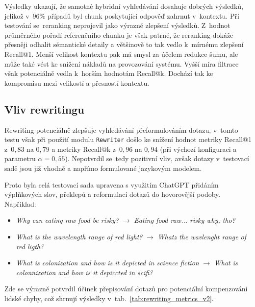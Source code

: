 Výsledky ukazují, že samotné hybridní vyhledávání dosahuje dobrých výsledků, jelikož v~96\% případů byl chunk poskytující odpověď zahrnut v~kontextu. Při testování se~reranking neprojevil jako výrazné zlepšení výsledků. Z~hodnot průměrného pořadí referenčního chunku je však patrné, že reranking dokáže přesněji odhalit sémantické detaily a většinově to tak vedlo k~mírnému zlepšení Recall@1. Menší velikost kontextu pak má smysl za účelem redukce šumu, ale může také vést ke snížení nákladů na provozování systému. Vyšší míra filtrace však potenciálně vedla k~horším hodnotám Recall@k. Dochází tak ke kompromisu mezi velikostí a přesností kontextu.   

\subsection{Vliv rewritingu}
Rewriting potenciálně zlepšuje vyhledávání přeformulováním dotazu, v~tomto testu však při použití modulu \texttt{Rewriter} došlo ke snížení hodnot metriky Recall@1 z~$0{,}83$ na $0{,}79$ a metriky Recall@k z~$0{,}96$ na $0{,}94$ (při výchozí konfiguraci a parametru $\alpha=0{,}55$). Nepotvrdil se~tedy pozitivní vliv, avšak dotazy v~testovací sadě jsou již vhodně a napřímo formulované jazykovým modelem. 


Proto byla celá testovací sada upravena s využitím ChatGPT přidáním výplňkových slov, překlepů a reformulací dotazů do hovorovější podoby. Například:

\begin{itemize}
    \item \textit{Why can eating raw food be risky?} $\rightarrow$ \textit{Eating food raw... risky why, tho?}
    \item \textit{What is the wavelength range of red light?} $\rightarrow$ \textit{Whatz the wavlenght range of red ligth?}
    \item \textit{What is colonization and how is it depicted in science fiction} $\rightarrow$ \textit{What is colonnization and how is it depiccted in scifi?}
\end{itemize}

\noindent Zde se výrazně potvrdil účinek přepisování dotazů pro potenciální kompenzování lidské chyby, což shrnují výsledky v~tab.~\ref{tab:rewriting_metrics_v2}.

